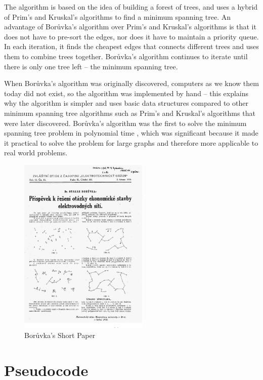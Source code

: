 \documentclass[a4paper, 11pt]{article}
\begin{document}
The algorithm is based on the idea of building a forest of trees, and uses a hybrid of Prim's and Kruskal's algorithms to find a minimum spanning tree. An advantage of Borůvka's algorithm over Prim's and Kruskal's algorithms is that it does not have to pre-sort the edges, nor does it have to maintain a priority queue. In each iteration, it finds the cheapest edges that connects different trees and uses them to combine trees together. Borůvka's algorithm continues to iterate until there is only one tree left -- the minimum spanning tree.

When Borůvka's algorithm was originally discovered, computers as we know them today did not exist, so the algorithm was implemented by hand -- this explains why the algorithm is simpler and uses basic data structures compared to other minimum spanning tree algorithms such as Prim's and Kruskal's algorithms that were later discovered. Borůvka's algorithm was the first to solve the minimum spanning tree problem in polynomial time \cite{deterministicMSTs}, which was significant because it made it practical to solve the problem for large graphs and therefore more applicable to real world problems. 

\begin{figure}[h]
    \caption{Borůvka's Short Paper \cite{nevsetvril2001otakar}}
    \begin{center}
        \includegraphics[width=0.55\textwidth]{Boruvka's Short Paper.png}
    \end{center}
\end{figure}

\section{Pseudocode}
\end{document}
